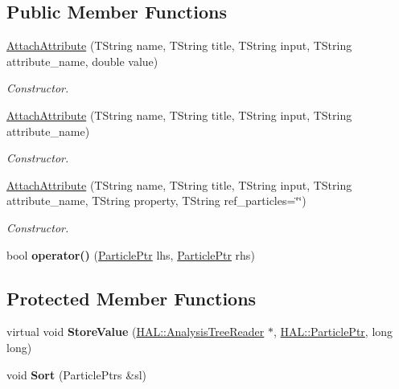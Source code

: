 \subsection*{Public Member Functions}
\begin{DoxyCompactItemize}
\item 
\hyperlink{class_h_a_l_1_1_algorithms_1_1_attach_attribute_a37e2bb1cec951e7d268c3d8fe7eef66d}{Attach\+Attribute} (T\+String name, T\+String title, T\+String input, T\+String attribute\+\_\+name, double value)
\begin{DoxyCompactList}\small\item\em Constructor. \end{DoxyCompactList}\item 
\hyperlink{class_h_a_l_1_1_algorithms_1_1_attach_attribute_a0c161228d7ba4e6b987d4d9d37375dde}{Attach\+Attribute} (T\+String name, T\+String title, T\+String input, T\+String attribute\+\_\+name)
\begin{DoxyCompactList}\small\item\em Constructor. \end{DoxyCompactList}\item 
\hyperlink{class_h_a_l_1_1_algorithms_1_1_attach_attribute_aaf92d33de944aaacdf536c6fe8f3a332}{Attach\+Attribute} (T\+String name, T\+String title, T\+String input, T\+String attribute\+\_\+name, T\+String property, T\+String ref\+\_\+particles=\char`\"{}\char`\"{})
\begin{DoxyCompactList}\small\item\em Constructor. \end{DoxyCompactList}\item 
\hypertarget{class_h_a_l_1_1_algorithms_1_1_attach_attribute_a3f490dfe32ddba9caeec144c4ec7253b}{bool {\bfseries operator()} (\hyperlink{class_h_a_l_1_1_generic_particle}{Particle\+Ptr} lhs, \hyperlink{class_h_a_l_1_1_generic_particle}{Particle\+Ptr} rhs)}\label{class_h_a_l_1_1_algorithms_1_1_attach_attribute_a3f490dfe32ddba9caeec144c4ec7253b}

\end{DoxyCompactItemize}
\subsection*{Protected Member Functions}
\begin{DoxyCompactItemize}
\item 
\hypertarget{class_h_a_l_1_1_algorithms_1_1_attach_attribute_afc87e37a8075b9486c1ec8b46c38b401}{virtual void {\bfseries Store\+Value} (\hyperlink{class_h_a_l_1_1_analysis_tree_reader}{H\+A\+L\+::\+Analysis\+Tree\+Reader} $\ast$, \hyperlink{class_h_a_l_1_1_generic_particle}{H\+A\+L\+::\+Particle\+Ptr}, long long)}\label{class_h_a_l_1_1_algorithms_1_1_attach_attribute_afc87e37a8075b9486c1ec8b46c38b401}

\item 
\hypertarget{class_h_a_l_1_1_algorithms_1_1_attach_attribute_ac1a523aff6683e97875a0ac3247092ad}{void {\bfseries Sort} (Particle\+Ptrs \&sl)}\label{class_h_a_l_1_1_algorithms_1_1_attach_attribute_ac1a523aff6683e97875a0ac3247092ad}

\end{DoxyCompactItemize}


